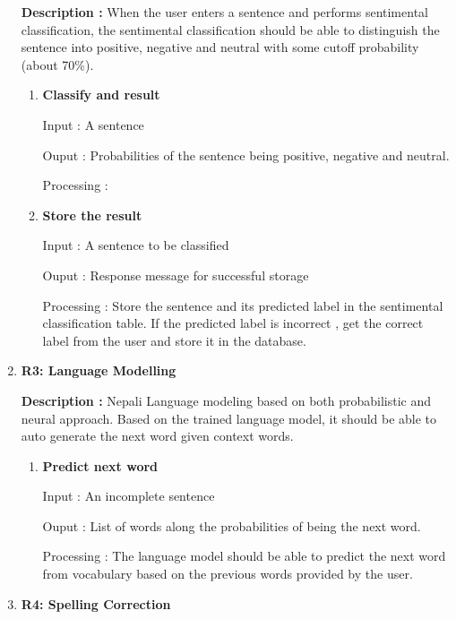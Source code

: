 \begin{enumerate}[font=\bfseries]
          \textbf{Description : }When the user enters a sentence and performs sentimental classification, the sentimental classification should be able to distinguish the sentence into positive, negative and neutral with some cutoff probability (about 70\%).

          \begin{enumerate}
              \item \textbf{Classify and result}

                    Input : A sentence

                    Ouput : Probabilities of the sentence being positive, negative and neutral.

                    Processing :

              \item \textbf{Store the result}

                    Input : A sentence to be classified

                    Ouput : Response message for successful storage

                    Processing : Store the sentence and its predicted label in the sentimental classification table. If the predicted label is incorrect , get the correct label from the user and store it in the database.
          \end{enumerate}

    \item \textbf{R3: Language Modelling}

          \textbf{Description : }Nepali Language modeling based on both probabilistic and neural approach. Based on the trained language model, it should be able to auto generate the next word given context words.

          \begin{enumerate}
              \item \textbf{Predict next word}

                    Input : An incomplete sentence

                    Ouput : List of words along the probabilities of being the next word.

                    Processing : The language model should be able to predict the next word from vocabulary based on the previous words provided by the user.
          \end{enumerate}

    \item \textbf{R4: Spelling Correction}


\end{enumerate}
